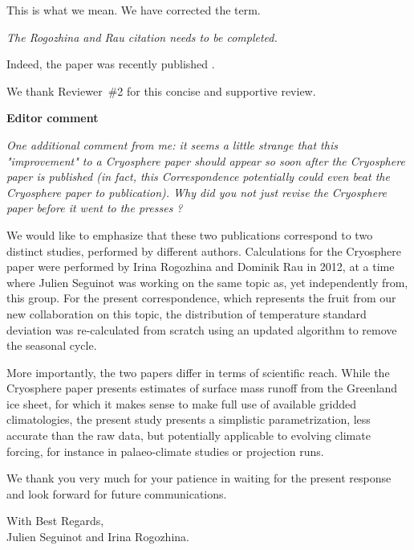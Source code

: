 \documentclass[10pt]{article}
\def\referee#1{\bigskip\textcolor{blue!50!black}{\textit{#1}}}
\begin{document}
This is what we mean. We have corrected the term.

\referee{The Rogozhina and Rau citation needs to be completed.}

Indeed, the paper was recently published \citep{rogozhina-rau-2014}.

We thank Reviewer~{\#}2 for this concise and supportive review.


\bigskip
\textbf{Editor comment}

\referee{One additional comment from me: it seems a little strange that this "improvement" to a Cryosphere paper should appear so soon after the Cryosphere paper is published (in fact, this Correspondence potentially could even beat the Cryosphere paper to publication). Why did you not just revise the Cryosphere paper before it went to the presses ?}

We would like to emphasize that these two publications correspond to two distinct studies, performed by different authors. Calculations for the Cryosphere paper were performed by Irina Rogozhina and Dominik Rau in 2012, at a time where Julien Seguinot was working on the same topic as, yet independently from, this group. For the present correspondence, which represents the fruit from our new collaboration on this topic, the distribution of temperature standard deviation was re-calculated from scratch using an updated algorithm to remove the seasonal cycle.

More importantly, the two papers differ in terms of scientific reach. While the Cryosphere paper presents estimates of surface mass runoff from the Greenland ice sheet, for which it makes sense to make full use of available gridded climatologies, the present study presents a simplistic parametrization, less accurate than the raw data, but potentially applicable to evolving climate forcing, for instance in palaeo-climate studies or projection runs.

We thank you very much for your patience in waiting for the present response and look forward for future communications.

{\flushright
    With Best Regards,\\
    Julien Seguinot and Irina Rogozhina.\\
}



\end{document}
